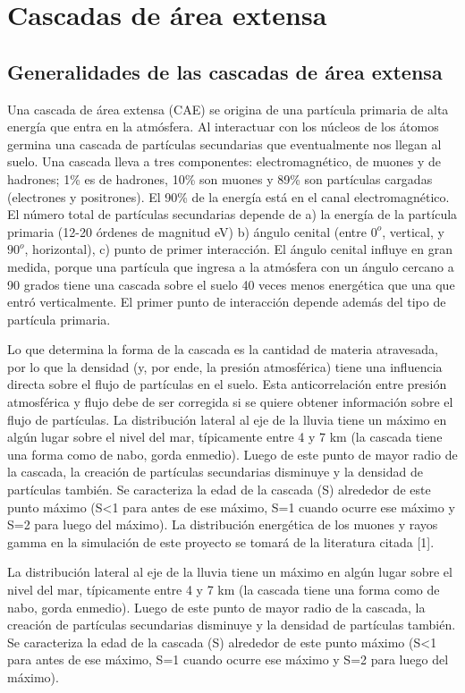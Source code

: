 \documentclass{book}
\begin{document}
\section{Cascadas de \'area extensa}
\subsection{Generalidades de las cascadas de \'area extensa}
Una cascada de \'area extensa (CAE) se origina de una part\'icula primaria de alta energ\'ia que entra en la atm\'osfera. Al interactuar con los n\'ucleos de los \'atomos germina una cascada de part\'iculas secundarias que eventualmente nos llegan al suelo. Una cascada lleva a tres componentes: electromagn\'etico, de muones y de hadrones; 1\% es de hadrones, 10\% son muones y 89\% son part\'iculas cargadas (electrones y positrones). El 90\% de la energ\'ia est\'a en el canal electromagn\'etico. El n\'umero total de part\'iculas secundarias depende de a) la energ\'ia de la part\'icula primaria (12-20 \'ordenes de magnitud eV) b) \'angulo cenital (entre $0^o$, vertical, y $90^o$, horizontal), c) punto de primer interacci\'on. El \'angulo cenital influye en gran medida, porque una part\'icula que ingresa a la atm\'osfera con un \'angulo cercano a 90 grados tiene una cascada sobre el suelo 40 veces menos energ\'etica que una que entr\'o verticalmente. El primer punto de interacci\'on depende adem\'as del tipo de part\'icula primaria. \citep{ASOREY}\citep{SUAREZ}

Lo que determina la forma de la cascada es la cantidad de materia atravesada, por lo que la densidad (y, por ende, la presi\'on atmosf\'erica) tiene una influencia directa sobre el flujo de part\'iculas en el suelo. Esta anticorrelaci\'on entre presi\'on atmosf\'erica y flujo debe de ser corregida si se quiere obtener informaci\'on sobre el flujo de part\'iculas. La distribuci\'on lateral al eje de la lluvia tiene un m\'aximo en alg\'un lugar sobre el nivel del mar, t\'ipicamente entre 4 y 7 km (la cascada tiene una forma como de nabo, gorda enmedio). Luego de este punto de mayor radio de la cascada, la creación de partículas secundarias disminuye y la densidad de partículas también. Se caracteriza la edad de la cascada (S) alrededor de este punto máximo (S<1 para antes de ese máximo, S=1 cuando ocurre ese máximo y S=2 para luego del máximo). La distribuci\'on energ\'etica de los muones y rayos gamma en la simulaci\'on de este proyecto se tomar\'a de la literatura citada [1]. \citep{ASOREY}\citep{SUAREZ}

La distribución lateral al eje de la lluvia tiene un máximo en algún lugar sobre el nivel del mar, típicamente entre 4 y 7 km (la cascada tiene una forma como de nabo, gorda enmedio). Luego de este punto de mayor radio de la cascada, la creación de partículas secundarias disminuye y la densidad de partículas también. Se caracteriza la edad de la cascada (S) alrededor de este punto máximo (S<1 para antes de ese máximo, S=1 cuando ocurre ese máximo y S=2 para luego del máximo). \citep{SUAREZ}
\end{document}
